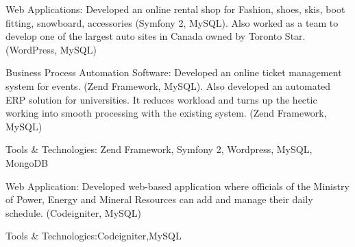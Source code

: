 \documentclass[letterpaper]{deedy-resume} %
\begin{document}
\begin{minipage}[t]{0.66\textwidth}
\begin{tightitemize}
\item Web Applications:
Developed an online rental shop for Fashion, shoes, skis, boot fitting, snowboard, accessories (Symfony 2, MySQL). Also worked as a team to develop one of the largest auto sites in Canada owned by Toronto Star. (WordPress, MySQL)

\item Business Process Automation Software:
Developed an online ticket management system for events. (Zend Framework, MySQL). Also developed an automated ERP solution for universities. It reduces workload and turns up the hectic working into smooth processing with the existing system. (Zend Framework, MySQL)

\item Tools & Technologies: Zend Framework, Symfony 2, Wordpress, MySQL, MongoDB
\end{tightitemize}
\sectionspace %


\begin{tightitemize}
\item Web Application:
Developed web-based application where officials of the Ministry of Power, Energy and Mineral Resources can add and manage their daily schedule. (Codeigniter, MySQL)
\item Tools & Technologies:Codeigniter,MySQL
\end{tightitemize}


\sectionspace %
\end{minipage} %
\end{document}
